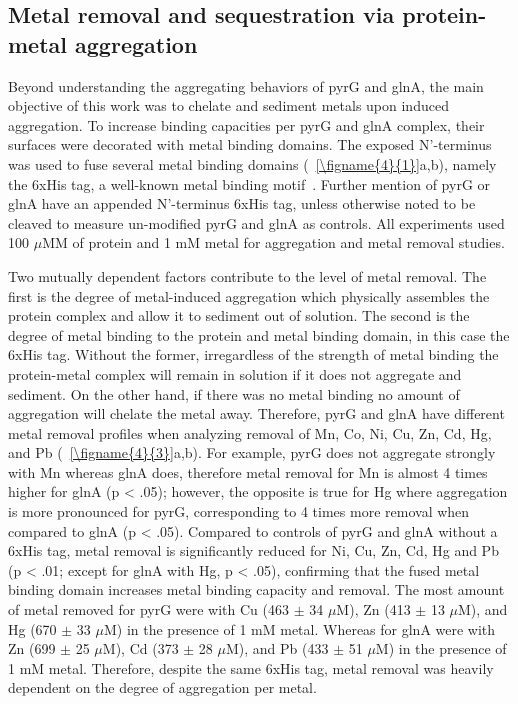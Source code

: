 \documentclass[../main/main]{subfiles}
\begin{document}
\subsection{Metal removal and sequestration via protein-metal aggregation}
Beyond understanding the aggregating behaviors of pyrG and glnA, the main objective of this work was to chelate and sediment metals upon induced aggregation. To increase binding capacities per pyrG and glnA complex, their surfaces were decorated with metal binding domains. The exposed N'-terminus was used to fuse several metal binding domains (\FIGURE~\ref{\figname{4}{1}}a,b), namely the 6xHis tag, a well-known metal binding motif~\cite{knecht2009}. Further mention of pyrG or glnA have an appended N'-terminus 6xHis tag, unless otherwise noted to be cleaved to measure un-modified pyrG and glnA as controls. All experiments used 100 $\mu$MM of protein and 1 mM metal for aggregation and metal removal studies.

Two mutually dependent factors contribute to the level of metal removal. The first is the degree of metal-induced aggregation which physically assembles the protein complex and allow it to sediment out of solution. The second is the degree of metal binding to the protein and metal binding domain, in this case the 6xHis tag. Without the former, irregardless of the strength of metal binding the protein-metal complex will remain in solution if it does not aggregate and sediment. On the other hand, if there was no metal binding no amount of aggregation will chelate the metal away. Therefore, pyrG and glnA have different metal removal profiles when analyzing removal of Mn, Co, Ni, Cu, Zn, Cd, Hg, and Pb (\FIGURE~\ref{\figname{4}{3}}a,b). For example, pyrG does not aggregate strongly with Mn whereas glnA does, therefore metal removal for Mn is almost 4 times higher for glnA (p < .05); however, the opposite is true for Hg where aggregation is more pronounced for pyrG, corresponding to 4 times more removal when compared to glnA (p < .05). Compared to controls of pyrG and glnA without a 6xHis tag, metal removal is significantly reduced for Ni, Cu, Zn, Cd, Hg and Pb (p < .01; except for glnA with Hg, p < .05), confirming that the fused metal binding domain increases metal binding capacity and removal. The most amount of metal removed for pyrG were with Cu (463 $\pm$ 34 $\mu$M), Zn (413 $\pm$ 13 $\mu$M), and Hg (670 $\pm$ 33 $\mu$M) in the presence of 1 mM metal. Whereas for glnA were with Zn (699 $\pm$ 25 $\mu$M), Cd (373 $\pm$ 28 $\mu$M), and Pb (433 $\pm$ 51 $\mu$M) in the presence of 1 mM metal. Therefore, despite the same 6xHis tag, metal removal was heavily dependent on the degree of aggregation per metal.
\end{document}
